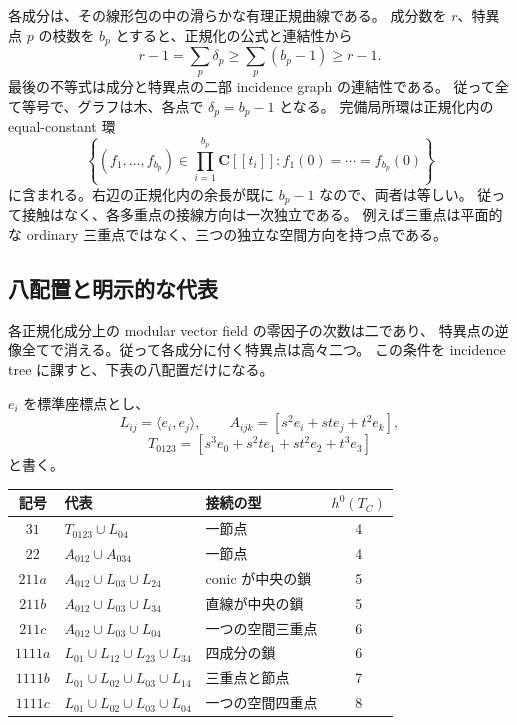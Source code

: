 \documentclass[11pt,a4paper]{ltjsarticle}
\newcommand{\CC}{\mathbf C}\newcommand{\QQ}{\mathbf Q}
\theoremstyle{remark}\newtheorem{remark}[theorem]{注意}
\begin{document}
各成分は、その線形包の中の滑らかな有理正規曲線である。
成分数を $r$、特異点 $p$ の枝数を $b_p$ とすると、正規化の公式と連結性から
\begin{equation}\label{eq:delta-equality}
r-1=\sum_p\delta_p\ge\sum_p(b_p-1)\ge r-1.
\end{equation}
最後の不等式は成分と特異点の二部 incidence graph の連結性である。
従って全て等号で、グラフは木、各点で $\delta_p=b_p-1$ となる。
完備局所環は正規化内の equal-constant 環
\begin{equation}\label{eq:ordinary-multiple}
\left\{(f_1,\ldots,f_{b_p})\in\prod_{i=1}^{b_p}\CC[[t_i]]:
f_1(0)=\cdots=f_{b_p}(0)\right\}
\end{equation}
に含まれる。右辺の正規化内の余長が既に $b_p-1$ なので、両者は等しい。
従って接触はなく、各多重点の接線方向は一次独立である。
例えば三重点は平面的な ordinary 三重点ではなく、三つの独立な空間方向を持つ点である。

\subsection{八配置と明示的な代表}

各正規化成分上の modular vector field の零因子の次数は二であり、
特異点の逆像全てで消える。従って各成分に付く特異点は高々二つ。
この条件を incidence tree に課すと、下表の八配置だけになる。

$e_i$ を標準座標点とし、
\[
L_{ij}=\langle e_i,e_j\rangle,\qquad
A_{ijk}=[s^2e_i+st e_j+t^2e_k],
\]
\[
T_{0123}=[s^3e_0+s^2t e_1+st^2e_2+t^3e_3]
\]
と書く。

\begin{center}\small
\begin{tabular}{@{}cllc@{}}
\toprule
記号 & 代表 & 接続の型 & $h^0(T_C)$\\
\midrule
$31$ & $T_{0123}\cup L_{04}$ & 一節点 &4\\
$22$ & $A_{012}\cup A_{034}$ & 一節点 &4\\
$211a$ & $A_{012}\cup L_{03}\cup L_{24}$ & conic が中央の鎖 &5\\
$211b$ & $A_{012}\cup L_{03}\cup L_{34}$ & 直線が中央の鎖 &5\\
$211c$ & $A_{012}\cup L_{03}\cup L_{04}$ & 一つの空間三重点 &6\\
$1111a$ & $L_{01}\cup L_{12}\cup L_{23}\cup L_{34}$ & 四成分の鎖 &6\\
$1111b$ & $L_{01}\cup L_{02}\cup L_{03}\cup L_{14}$ & 三重点と節点 &7\\
$1111c$ & $L_{01}\cup L_{02}\cup L_{03}\cup L_{04}$ & 一つの空間四重点 &8\\
\bottomrule
\end{tabular}\end{center}
\end{document}
